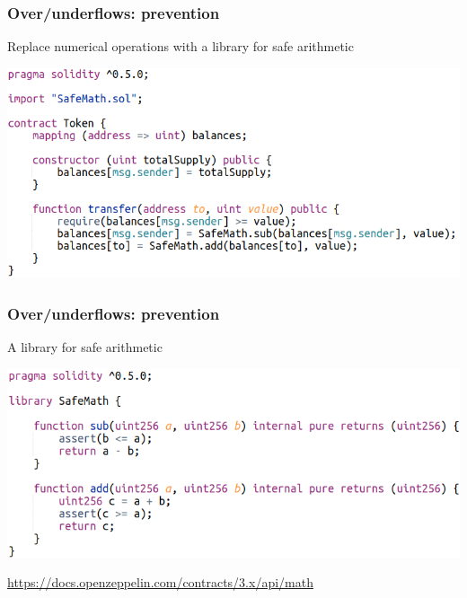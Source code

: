 \documentclass[11pt]{beamer}  %
\begin{document}
\begin{frame}\frametitle{Over/underflows: prevention}

  \begin{greenbox}{Replace numerical operations with a library for safe arithmetic}
    \begin{center}
      \includegraphics[scale=0.45,clip=false]{pictures/under-overflow-fixed.png}
    \end{center}
  \end{greenbox}
    
\end{frame}

\begin{frame}\frametitle{Over/underflows: prevention}

  \begin{greenbox}{A library for safe arithmetic}
    \begin{center}
      \includegraphics[scale=0.45,clip=false]{pictures/safe-math.png}
    \end{center}
  \end{greenbox}

  \medskip

  \begin{center}
    \url{https://docs.openzeppelin.com/contracts/3.x/api/math}
  \end{center}
  
\end{frame}
\end{document}
